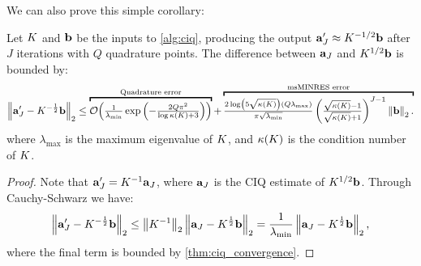 We can also prove this simple corollary:
%
\begin{corollary}
  Let $K$ and $\mathbf{b}$ be the inputs to \cref{alg:ciq}, producing the output $\mathbf{a}_J' \approx K^{-1/2} \mathbf{b}$ after $J$ iterations with $Q$ quadrature points.
  The difference between $\mathbf{a}_J$ and $K^{1/2} \mathbf{b}$ is bounded by:
  \begin{equation*}
    \left\Vert \ba_J' - \bK^{-\frac 1 2} \bb \right\Vert_2
    \leq
    \overbracket{
      \bigo{ \tfrac{1}{\lambda_\text{min}} \exp\left( -\tfrac  {2 Q \pi^2}{\log \kappa(\bK) + 3} \right)}
    }^{\text{Quadrature error}}
    +
    \overbracket{
      \tfrac{ 2 \log \left( 5 \sqrt{\kappa(\bK)} \right)  \left( Q \lambda_\text{max}  \right) }{\pi \sqrt{\lambda_\text{min}}}
      \left( \tfrac{ \sqrt{\kappa(\bK)} - 1}{ \sqrt{\kappa(\bK)} + 1} \right)^{J-1}
      \left\Vert \bb \right\Vert_2.
    }^{\text{msMINRES error}}
  \end{equation*}
  where $\lambda_\text{max}$ is the maximum eigenvalue of $K$, and $\kappa(K)$ is the condition number of $K$.
  \label{thm:ciq_convergence_inverse}
\end{corollary}

\begin{proof}
  Note that $\mathbf{a}_J' = K^{-1} \mathbf{a}_J$, where $\mathbf{a}_J$ is the CIQ estimate of $K^{1/2} \mathbf{b}$.
  Through Cauchy-Schwarz we have:
  \[
    \left\Vert \mathbf{a}_J' - K^{-\frac 1 2} \mathbf{b} \right\Vert_2
    \leq \left\Vert K^{-1} \right\Vert_2 \left\Vert \mathbf{a}_J - K^{\frac 1 2} \mathbf{b} \right\Vert_2
    = \frac{1}{\lambda_\text{min}} \left\Vert \mathbf{a}_J - K^{\frac 1 2} \mathbf{b} \right\Vert_2,
  \]
  where the final term is bounded by \cref{thm:ciq_convergence}.
\end{proof}
